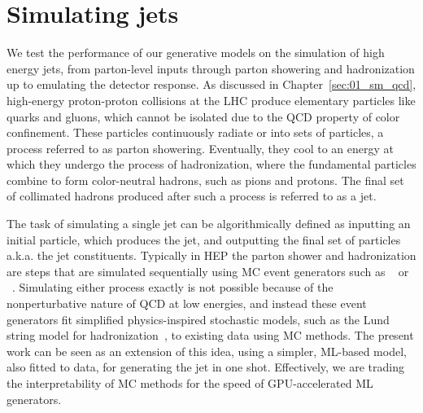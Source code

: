 
\section{Simulating jets}
\label{sec:04_jetnet_jets}

We test the performance of our generative models on the simulation of high energy jets, from parton-level inputs through parton showering and hadronization up to emulating the detector response.
As discussed in Chapter~\ref{sec:01_sm_qcd}, high-energy proton-proton collisions at the LHC produce elementary particles like quarks and gluons, which cannot be isolated due to the QCD property of color confinement.
These particles continuously radiate or into sets of particles, a process referred to as parton showering.
Eventually, they cool to an energy at which they undergo the process of hadronization, where the fundamental particles combine to form color-neutral hadrons, such as pions and protons.
The final set of collimated hadrons produced after such a process is referred to as a jet.

The task of simulating a single jet can be algorithmically defined as inputting an initial particle, which produces the jet, and outputting the final set of particles a.k.a. the jet constituents.
Typically in HEP the parton shower and hadronization are steps that are simulated sequentially using MC event generators such as \PYTHIA~\cite{pythia} or \HERWIG~\cite{herwig}.
Simulating either process exactly is not possible because of the nonperturbative nature of QCD at low energies, and instead these event generators fit simplified physics-inspired stochastic models, such as the Lund string model for hadronization~\cite{Andersson:1983ia}, to existing data using MC methods.
The present work can be seen as an extension of this idea, using a simpler, ML-based model, also fitted to data, for generating the jet in one shot.
Effectively, we are trading the interpretability of MC methods for the speed of GPU-accelerated ML generators.


